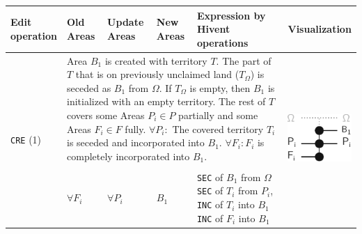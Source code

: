 \begin{center}
\begin{longtable}{m{1.2cm} m{0.95cm} m{0.95cm} m{0.95cm} m{6.0cm} m{2.3cm}}
  \toprule

  \pbox{1.2cm}{Edit \\ operation\\[-1.2em]} &
  \pbox{0.95cm}{Old\\Areas\\[-1.2em]} &
  \pbox{0.95cm}{Update\\Areas\\[-1.2em]} &
  \pbox{0.95cm}{New\\Areas\\[-1.4em]} &
  Expression by Hivent operations \protect\footnotemark &
  Visualization \\
  \midrule
  \endhead



  \multirow{9}{*}{\texttt{CRE} (1)} &
  \multicolumn{4}{p{10cm}}{
    Area $B_1$ is created with territory $T$. The part of $T$ that is on previously unclaimed land ($T_\Omega$) is seceded as $B_1$ from $\Omega$.
    If $T_\Omega$ is empty, then $B_1$ is initialized with an empty territory.
    The rest of $T$ covers some Areas $P_i \in P$ partially and some Areas $F_i \in F$ fully.
    $\forall P_i:$ The covered territory $T_i$ is seceded and incorporated into $B_1$.
    $\forall F_i: F_i$ is completely incorporated into $B_1$.
  } &
  \multirow{9}{*}{
    \includegraphics[width=2.5cm]{graphics/development/editing_hivent_data/edit_to_hivent_operations/CRE_to_SEC+UNI}
  } \\
  & \\[-0.85em]
  &
  $\forall F_i$ &
  $\forall P_i$ &
  $B_1$ &
  \pbox{6.0cm}{
    \texttt{SEC} of $B_1$ from $\Omega$ \\
    \texttt{SEC} of $T_i$ from $P_i$, \texttt{INC} of $T_i$ into $B_1$ \\
    \texttt{INC} of $F_i$ into $B_1$
  } &
  \\



\end{longtable}
\end{center}
